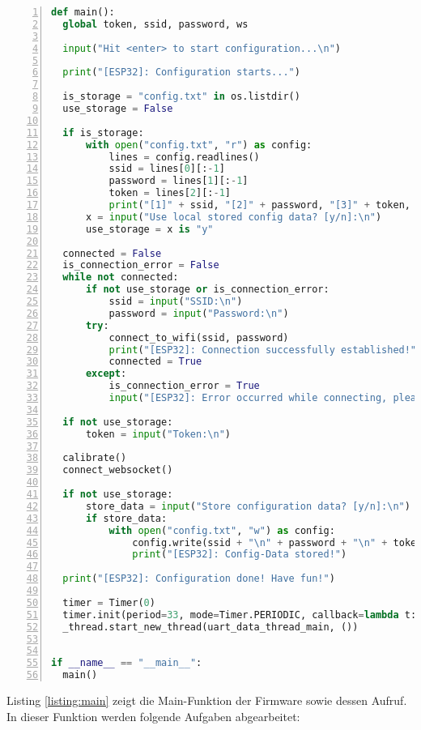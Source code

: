 \documentclass[paper=a4,12pt]{scrreprt}
\begin{document}
\begin{lstlisting}[caption={Firmware: Main-Funktion}, captionpos=b, label={listing:main}, language=python, morekeywords={async, await, with, None}, numbers=left,
  stepnumber=1]
def main():
  global token, ssid, password, ws

  input("Hit <enter> to start configuration...\n")

  print("[ESP32]: Configuration starts...")

  is_storage = "config.txt" in os.listdir()
  use_storage = False

  if is_storage:
      with open("config.txt", "r") as config:
          lines = config.readlines()
          ssid = lines[0][:-1]
          password = lines[1][:-1]
          token = lines[2][:-1]
          print("[1]" + ssid, "[2]" + password, "[3]" + token, sep="\n")
      x = input("Use local stored config data? [y/n]:\n")
      use_storage = x is "y"

  connected = False
  is_connection_error = False
  while not connected:
      if not use_storage or is_connection_error:
          ssid = input("SSID:\n")
          password = input("Password:\n")
      try:
          connect_to_wifi(ssid, password)
          print("[ESP32]: Connection successfully established!")
          connected = True
      except:
          is_connection_error = True
          input("[ESP32]: Error occurred while connecting, please try again.")

  if not use_storage:
      token = input("Token:\n")

  calibrate()
  connect_websocket()

  if not use_storage:
      store_data = input("Store configuration data? [y/n]:\n") == "y"
      if store_data:
          with open("config.txt", "w") as config:
              config.write(ssid + "\n" + password + "\n" + token + "\n")
              print("[ESP32]: Config-Data stored!")

  print("[ESP32]: Configuration done! Have fun!")

  timer = Timer(0)
  timer.init(period=33, mode=Timer.PERIODIC, callback=lambda t: retrieve_data())
  _thread.start_new_thread(uart_data_thread_main, ())


if __name__ == "__main__":
  main()
\end{lstlisting}

Listing \ref{listing:main} zeigt die Main-Funktion der Firmware sowie dessen Aufruf. In dieser Funktion werden folgende Aufgaben abgearbeitet:\newline
\end{document}
